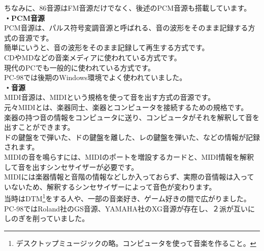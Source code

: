 \documentclass[b5paper,9pt,platex,dvipdfmx]{jsarticle}
\begin{document}
\begin{multicols*}{3}
\begin{enumerate}
  ちなみに、86音源はFM音源だけでなく、後述のPCM音源も搭載しています。\\
  {\bf ・PCM音源 \\}
  PCM音源は、パルス符号変調音源と呼ばれる、音の波形をそのまま記録する方式の音源です。\\
  簡単にいうと、音の波形をそのまま記録して再生する方式です。\\
  CDやMDなどの音楽メディアに使われている方式です。\\
  現代のPCでも一般的に使われている方式です。\\
  PC-98では後期のWindows環境でよく使われていました。\\
  {\bf ・音源 \\}
  MIDI音源は、MIDIという規格を使って音を出す方式の音源です。\\
  元々MIDIとは、楽器同士、楽器とコンピュータを接続するための規格です。\\
  楽器の持つ音の情報をコンピュータに送り、コンピュータがそれを解釈して音を出すことができます。\\
  ドの鍵盤をで弾いた、ドの鍵盤を離した、レの鍵盤を弾いた、などの情報が記録されます。\\
  MIDIの音を鳴らすには、MIDIのポートを増設するカードと、MIDI情報を解釈して音を出すシンセサイザーが必要です。\\
  MIDIには楽器情報と音階の情報などしか入っておらず、実際の音情報は入っていないため、解釈するシンセサイザーによって音色が変わります。\\
  当時はDTM\footnote{デスクトップミュージックの略。コンピュータを使って音楽を作ること。}をする人や、一部の音楽好き、ゲーム好きの間で広がりました。\\
  PC-98ではRoland社のGS音源、YAMAHA社のXG音源が存在し、２派が互いにしのぎを削っていました。\\
\end{enumerate}
\end{multicols*}
\end{document}
